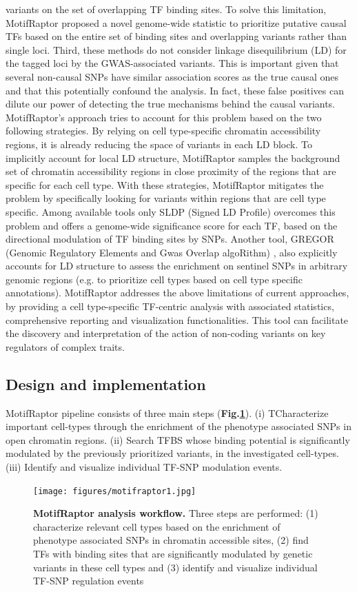 \documentclass[a4paper, titlepage, openright]{book}
\newcommand{\motifraptor}{MotifRaptor\xspace}
\begin{document}
variants on the set of overlapping TF binding sites. To solve this limitation, \motifraptor proposed a novel genome-wide statistic to prioritize putative causal TFs based on the entire set of binding sites and overlapping variants rather than single loci. Third, these methods do not consider linkage disequilibrium (LD) for the tagged loci by the GWAS-associated variants. This is important given that several non-causal SNPs have similar association scores as the true causal ones and that this potentially confound the analysis. In fact, these false positives can dilute our power of detecting the true mechanisms behind the causal variants. \motifraptor's approach tries to account for this problem based on the two following strategies. By relying on cell type-specific chromatin accessibility regions, it is already reducing the space of variants in each LD block. To implicitly account for local LD structure, \motifraptor samples the background set of chromatin accessibility regions in close proximity of the regions that are specific for each cell type. With these strategies, \motifraptor mitigates the problem by specifically looking for variants within regions that are cell type specific. Among available tools only SLDP (Signed LD Profile) \citep{reshef2018detecting} overcomes this problem and offers a genome-wide significance score for each TF, based on the directional modulation of TF binding sites by SNPs. Another tool, GREGOR (Genomic Regulatory Elements and Gwas Overlap algoRithm) \citep{schmidt2015gregor}, also explicitly accounts for LD structure to assess the enrichment on sentinel SNPs in arbitrary genomic regions (e.g. to prioritize cell types based on cell type specific annotations). \motifraptor addresses the above limitations of current approaches, by providing a cell type-specific TF-centric analysis with associated statistics, comprehensive reporting and visualization functionalities. This tool can facilitate the discovery and interpretation of the action of non-coding variants on key regulators of complex traits.
\subsection{Design and implementation}
\motifraptor pipeline consists of three main steps (\textbf{Fig.\ref{fig:motifraptor1}}). (i) TCharacterize important cell-types through the enrichment of the phenotype associated SNPs in open chromatin regions. (ii) Search TFBS whose binding potential is significantly modulated by the previously prioritized variants, in the investigated cell-types. (iii) Identify and visualize individual TF-SNP modulation events. 
\begin{figure}
	\centering
	\texttt{[image: figures/motifraptor1.jpg]}
	\caption[MotifRaptor analysis workflow]{\textbf{MotifRaptor analysis workflow.} Three steps are performed: (1) characterize
relevant cell types based on the enrichment of phenotype associated SNPs in chromatin accessible
sites, (2) find TFs with binding sites that are significantly modulated by genetic variants in these
cell types and (3) identify and visualize individual TF-SNP regulation events}
	\label{fig:motifraptor1}
\end{figure} 
\end{document}
